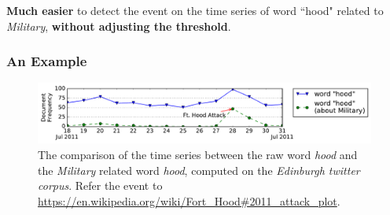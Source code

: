 \documentclass{beamer}
\begin{document}
\begin{frame}
\textbf{Much easier} to detect the event on the time series of word ``hood" related to \textit{Military}, \textbf{without adjusting the threshold}.
\frametitle{An Example}	
\begin{figure}[h]
		\setlength{\abovecaptionskip}{0.cm}
        \setlength{\belowcaptionskip}{0.cm}
        \centering
        \includegraphics[width=1.0\columnwidth]{../img/hood.pdf}
        \caption{The comparison of the time series between the raw word \textit{hood} and the \textit{Military} related word \textit{hood}, computed on the \textit{Edinburgh twitter corpus}. Refer the event to \url{https://en.wikipedia.org/wiki/Fort_Hood\#2011_attack_plot}.}
        \label{fig:hood}
\end{figure}

\begin{figure}[h]
	\setlength{\abovecaptionskip}{0.cm}
	\setlength{\belowcaptionskip}{0.cm}
	\centering
\end{figure}


\end{frame}
\end{document}
